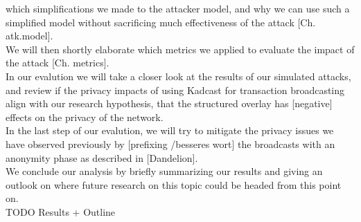which simplifications we made to the attacker model, and why we can use such a simplified model
without sacrificing much effectiveness of the attack [Ch. atk.model]. \\
We will then shortly elaborate which metrics we applied to evaluate the impact of the attack [Ch. metrics]. \\
In our evalution we will take a closer look at the results of our simulated attacks, and
review if the privacy impacts of using Kadcast for transaction broadcasting align with our
research hypothesis, that the structured overlay has [negative] effects on the privacy of the network. \\
In the last step of our evalution, we will try to mitigate the privacy issues we have observed previously
by [prefixing /besseres wort] the broadcasts with an anonymity phase as described in [Dandelion]. \\
We conclude our analysis by briefly summarizing our results and giving an outlook
on where future research on this topic could be headed from this point on. \\
TODO Results + Outline



